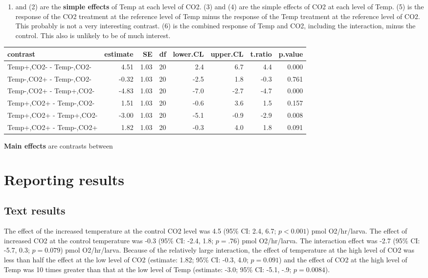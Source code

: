 \documentclass[]{book}
\providecommand{\tightlist}{%
  \setlength{\itemsep}{0pt}\setlength{\parskip}{0pt}}
\begin{document}
\begin{enumerate}
\def\labelenumi{(\arabic{enumi})}
\tightlist
\item
  and (2) are the \textbf{simple effects} of Temp at each level of CO2.
  (3) and (4) are the simple effects of CO2 at each level of Temp. (5)
  is the response of the CO2 treatment at the reference level of Temp
  minus the response of the Temp treatment at the reference level of
  CO2. This probably is not a very interesting contrast. (6) is the
  combined response of Temp and CO2, including the interaction, minus
  the control. This also is unlikely to be of much interest.
\end{enumerate}

\begin{tabular}{l|r|r|r|r|r|r|r}
\hline
contrast & estimate & SE & df & lower.CL & upper.CL & t.ratio & p.value\\
\hline
Temp+,CO2- - Temp-,CO2- & 4.51 & 1.03 & 20 & 2.4 & 6.7 & 4.4 & 0.000\\
\hline
Temp-,CO2+ - Temp-,CO2- & -0.32 & 1.03 & 20 & -2.5 & 1.8 & -0.3 & 0.761\\
\hline
Temp-,CO2+ - Temp+,CO2- & -4.83 & 1.03 & 20 & -7.0 & -2.7 & -4.7 & 0.000\\
\hline
Temp+,CO2+ - Temp-,CO2- & 1.51 & 1.03 & 20 & -0.6 & 3.6 & 1.5 & 0.157\\
\hline
Temp+,CO2+ - Temp+,CO2- & -3.00 & 1.03 & 20 & -5.1 & -0.9 & -2.9 & 0.008\\
\hline
Temp+,CO2+ - Temp-,CO2+ & 1.82 & 1.03 & 20 & -0.3 & 4.0 & 1.8 & 0.091\\
\hline
\end{tabular}

\textbf{Main effects} are contrasts between

\section{Reporting results}\label{reporting-results-2}

\subsection{Text results}\label{text-results}

The effect of the increased temperature at the control CO2 level was 4.5
(95\% CI: 2.4, 6.7; \(p < 0.001\)) pmol O2/hr/larva. The effect of
increased CO2 at the control temperature was -0.3 (95\% CI: -2.4, 1.8;
\(p=.76\)) pmol O2/hr/larva. The interaction effect was -2.7 (95\% CI:
-5.7, 0.3; \(p = 0.079\)) pmol O2/hr/larva. Because of the relatively
large interaction, the effect of temperature at the high level of CO2
was less than half the effect at the low level of CO2 (estimate: 1.82;
95\% CI: -0.3, 4.0; \(p = 0.091\)) and the effect of CO2 at the high
level of Temp was 10 times greater than that at the low level of Temp
(estimate: -3.0; 95\% CI: -5.1, -.9; \(p = 0.0084\)).
\end{document}
